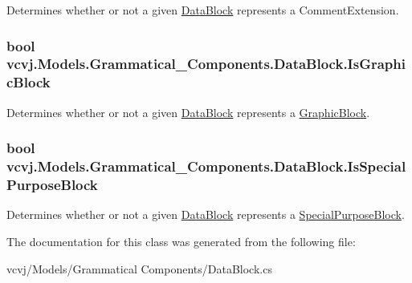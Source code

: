 Determines whether or not a given \hyperlink{classvcvj_1_1_models_1_1_grammatical___components_1_1_data_block}{Data\+Block} represents a Comment\+Extension. 

\subsubsection[{\texorpdfstring{Is\+Graphic\+Block}{IsGraphicBlock}}]{\setlength{\rightskip}{0pt plus 5cm}bool vcvj.\+Models.\+Grammatical\+\_\+\+Components.\+Data\+Block.\+Is\+Graphic\+Block\hspace{0.3cm}{\ttfamily [get]}}\hypertarget{classvcvj_1_1_models_1_1_grammatical___components_1_1_data_block_a18ed19c8e02d40cc2551f3d9dc829505}{}\label{classvcvj_1_1_models_1_1_grammatical___components_1_1_data_block_a18ed19c8e02d40cc2551f3d9dc829505}


Determines whether or not a given \hyperlink{classvcvj_1_1_models_1_1_grammatical___components_1_1_data_block}{Data\+Block} represents a \hyperlink{classvcvj_1_1_models_1_1_grammatical___components_1_1_graphic_block}{Graphic\+Block}. 

\subsubsection[{\texorpdfstring{Is\+Special\+Purpose\+Block}{IsSpecialPurposeBlock}}]{\setlength{\rightskip}{0pt plus 5cm}bool vcvj.\+Models.\+Grammatical\+\_\+\+Components.\+Data\+Block.\+Is\+Special\+Purpose\+Block\hspace{0.3cm}{\ttfamily [get]}}\hypertarget{classvcvj_1_1_models_1_1_grammatical___components_1_1_data_block_a734766451ecfc504f507459fffb500a8}{}\label{classvcvj_1_1_models_1_1_grammatical___components_1_1_data_block_a734766451ecfc504f507459fffb500a8}


Determines whether or not a given \hyperlink{classvcvj_1_1_models_1_1_grammatical___components_1_1_data_block}{Data\+Block} represents a \hyperlink{classvcvj_1_1_models_1_1_grammatical___components_1_1_special_purpose_block}{Special\+Purpose\+Block}. 



The documentation for this class was generated from the following file\+:\begin{DoxyCompactItemize}
\item 
vcvj/\+Models/\+Grammatical Components/Data\+Block.\+cs\end{DoxyCompactItemize}
